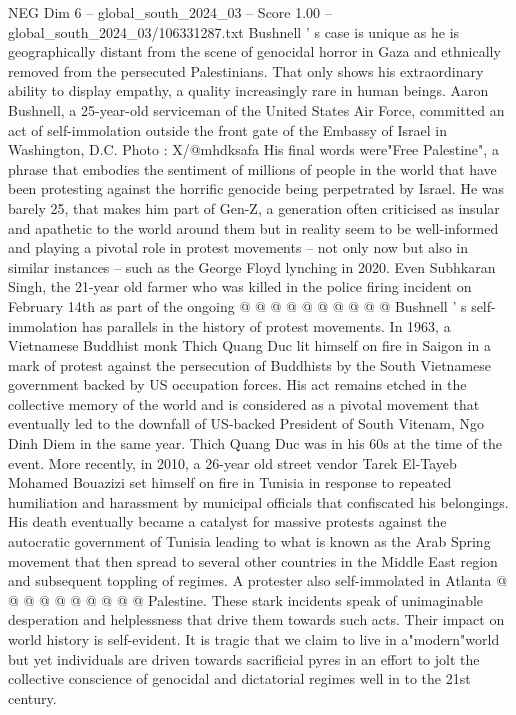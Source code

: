\begin{textsample}{NEG Dim 6 – global\_south\_2024\_03 – Score 1.00 – global\_south\_2024\_03/106331287.txt}  \label{ex:f6_neg_411}
Bushnell ' s case is unique as he is geographically distant from the scene of genocidal horror in Gaza and ethnically removed from the persecuted Palestinians.
That only shows his extraordinary ability to display empathy, a quality increasingly rare in human beings.
Aaron Bushnell, a 25-year-old serviceman of the United States Air Force, committed an act of self-immolation outside the front gate of the Embassy of Israel in Washington, D.C.
Photo : X/@mhdksafa His final words were"Free Palestine", a phrase that embodies the sentiment of millions of people in the world that have been protesting against the horrific genocide being perpetrated by Israel.
He was barely 25, that makes him part of Gen-Z, a generation often criticised as insular and apathetic to the world around them but in reality seem to be well-informed and playing a pivotal role in protest movements -- not only now but also in similar instances -- such as the George Floyd lynching in 2020.
Even Subhkaran Singh, the 21-year old farmer who was killed in the police firing incident on February 14th as part of the ongoing @ @ @ @ @ @ @ @ @ @ Bushnell ' s self-immolation has parallels in the history of protest movements.
In 1963, a Vietnamese Buddhist monk Thich Quang Duc lit himself on fire in Saigon in a mark of protest against the persecution of Buddhists by the South Vietnamese government backed by US occupation forces.
His act remains etched in the collective memory of the world and is considered as a pivotal movement that eventually led to the downfall of US-backed President of South Vitenam, Ngo Dinh Diem in the same year.
Thich Quang Duc was in his 60s at the time of the event.
More recently, in 2010, a 26-year old street vendor Tarek El-Tayeb Mohamed Bouazizi set himself on fire in Tunisia in response to repeated humiliation and harassment by municipal officials that confiscated his belongings.
His death eventually became a catalyst for massive protests against the autocratic government of Tunisia leading to what is known as the Arab Spring movement that then spread to several other countries in the Middle East region and subsequent toppling of regimes.
A protester also self-immolated in Atlanta @ @ @ @ @ @ @ @ @ @ Palestine.
These stark incidents speak of unimaginable desperation and helplessness that drive them towards such acts.
Their impact on world history is self-evident.
It is tragic that we claim to live in a"modern"world but yet individuals are driven towards sacrificial pyres in an effort to jolt the collective conscience of genocidal and dictatorial regimes well in to the 21st century.

\end{textsample}
